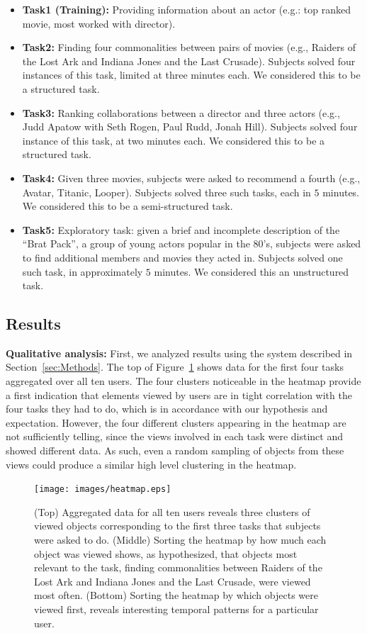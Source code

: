 \begin{itemize}
	\item \textbf{Task1 (Training):} Providing information about an actor (e.g.: top ranked movie, most worked with director).
	\item \textbf{Task2:} Finding four commonalities between pairs of movies (e.g., Raiders of the Lost Ark and Indiana Jones and the Last Crusade). Subjects solved four instances of this task, limited at three minutes each.  We considered this to be a structured task.
	\item \textbf{Task3:} Ranking collaborations between a director and three actors (e.g., Judd Apatow with Seth Rogen, Paul Rudd, Jonah Hill). Subjects solved four instance of this task, at two minutes each. We considered this to be a structured task.
	\item \textbf{Task4:} Given three movies, subjects were asked to recommend a fourth (e.g., Avatar, Titanic, Looper). Subjects solved three such tasks, each in $5$ minutes. We considered this to be a semi-structured task.
	\item \textbf{Task5:} Exploratory task: given a brief and incomplete description of the ``Brat Pack'', a group of young actors popular in the 80's, subjects were asked to find additional members and movies they acted in. Subjects solved one such task, in approximately $5$ minutes. We considered this an unstructured task.
\end{itemize}


\subsection{Results}

\textbf{Qualitative analysis: } First, we analyzed results using the system described in Section~\ref{sec:Methods}. The top of Figure~\ref{fig:heatmap} shows data for the first four tasks aggregated over all ten users. The four clusters noticeable in the heatmap provide a first indication that elements viewed by users are in tight correlation with the four tasks they had to do, which is in accordance with our hypothesis and expectation. However, the four different clusters appearing in the heatmap are not sufficiently telling, since the views involved in each task were distinct and showed different data. As such, even a random sampling of objects from these views could produce a similar high level clustering in the heatmap. 

\begin{figure}[htb]
  \centering
  \texttt{[image: images/heatmap.eps]}
  \caption{(Top) Aggregated data for all ten users reveals three clusters of viewed objects corresponding to the first three tasks that subjects were asked to do. (Middle) Sorting the heatmap by how much each object was viewed shows, as hypothesized, that objects most relevant to the task, finding commonalities between Raiders of the Lost Ark and Indiana Jones and the Last Crusade, were viewed most often. (Bottom) Sorting the heatmap by which objects were viewed first, reveals interesting temporal patterns for a particular user. }
	\label{fig:heatmap}
\end{figure}

